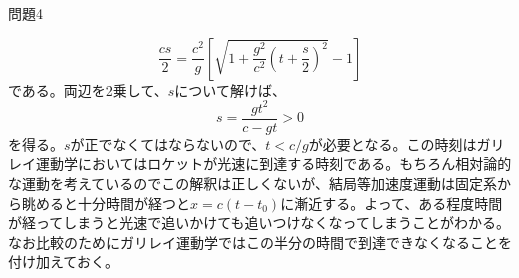 \documentclass[fleqn]{jbook}
\begin{document}
\begin{answer}{問題4}{}
\begin{enumerate}
$$ \frac{cs}{2} = \frac{c^2}{g}\left[\sqrt{1+\frac{g^2}{c^2}\left(t+\frac{s}{2}\right)^2}-1\right]$$
である。両辺を2乗して、$s$について解けば、
$$ s = \frac{gt^2}{c-gt} > 0$$
を得る。$s$が正でなくてはならないので、$t<c/g $が必要となる。この時刻はガリレイ運動学においてはロケットが光速に到達する時刻である。もちろん相対論的な運動を考えているのでこの解釈は正しくないが、結局等加速度運動は固定系から眺めると十分時間が経つと$x = c(t-t_0)$に漸近する。よって、ある程度時間が経ってしまうと光速で追いかけても追いつけなくなってしまうことがわかる。なお比較のためにガリレイ運動学ではこの半分の時間で到達できなくなることを付け加えておく。
\end{enumerate}

\end{answer}
\end{document}
